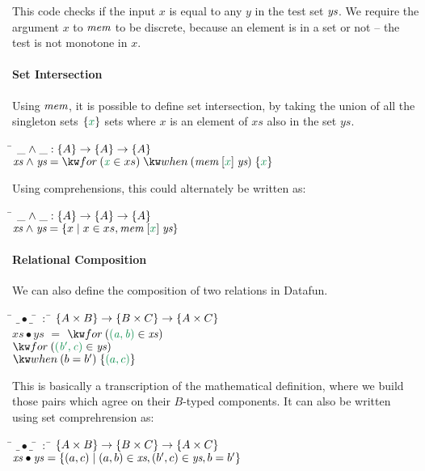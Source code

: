 This code checks if the input $x$
is equal to any $y$ in the test set $\text{\itshape ys}$. We require the argument $x$ to
$\text{\itshape mem}$ to be discrete, because an element is in a set or not -- the test
is not monotone in $x$. 

\paragraph{Set Intersection}
Using $\text{\itshape mem}$, it is possible to define set intersection, by taking the union of
all the singleton sets $\eset{x}$ sets where $x$ is an element of $xs$ also in the set $ys$.

\begin{tabbing}
  \qquad\=\+ \kill
  $\_ \wedge \_ : \tset A \to \tset A \to \tset A$ \\
  $\name{xs} \wedge \name{ys} = \efor{x}{xs} \ewhen{\name{mem}\;\ebox{x}\;\name{ys}}{\eset{x}}$ 
\end{tabbing}
Using comprehensions, this could alternately be written as:
\begin{tabbing}
  \qquad\=\+ \kill
  $\_ \wedge \_ : \tset A \to \tset A \to \tset A$ \\
  $\name{xs} \wedge \name{ys} = \setfor{x}{x \in xs, \name{mem}\;\ebox{x}\;\name{ys}}$
\end{tabbing}

\paragraph{Relational Composition}
We can also define the composition of two relations in Datafun. 
\begin{tabbing}
  \qquad\=\+ \kill
  $\_ \bullet \_$ \;\;\;\= $\,:$\;\; \=
  $ \{{A \times B}\} \to \{{B \times C}\} \to \{{A \times C}\}$ \\

  $\mathit{xs} \bullet \mathit{ys}$ \> $=$ \> $\efor{(a,b)}{\mathit{xs}}{}$ \\
                                    \>     \> $\efor{(b',c)}{\mathit{ys}}{}$ \\
                                    \>     \> $\ewhen{b = b'}{\eset{(a,c)}}$
\end{tabbing}
This is basically a transcription of the mathematical definition, where we build
those pairs which agree on their $B$-typed components. It can also be written using
set comprehrension as:
\begin{tabbing}
  \qquad\=\+ \kill
  $\_ \bullet \_$ \;\;\;\= $\,:$\;\; \=
  $ \{{A \times B}\} \to \{{B \times C}\} \to \{{A \times C}\}$ \\

  $\mathit{xs} \bullet \mathit{ys} = \{(a,c) \mathrel{|} (a,b) \in \text{\itshape xs}, (b', c) \in \text{\itshape ys}, b = b'\}$
\end{tabbing}


